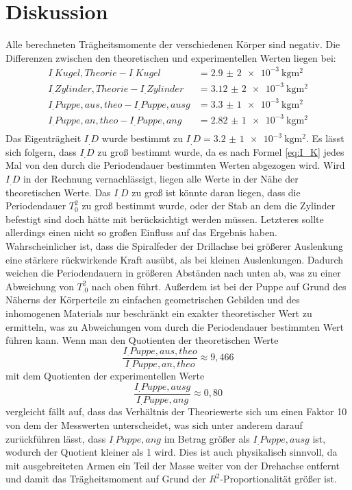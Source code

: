 \section{Diskussion}
\label{sec:Diskussion}
Alle berechneten Trägheitsmomente der verschiedenen Körper sind negativ.
Die Differenzen zwischen den theoretischen und experimentellen Werten liegen bei:
\begin{align*}
I_.{Kugel,Theorie}-I_.{Kugel}		&=\SI{2,9(2)e-3}{\kilo\gram\metre\squared}\\
I_.{Zylinder,Theorie}-I_.{Zylinder}	&=\SI{3,12(2)e-3}{\kilo\gram\metre\squared}\\
I_.{Puppe,aus,theo}-I_.{Puppe,ausg}	&=\SI{3,3(1)e-3}{\kilo\gram\metre\squared}\\
I_.{Puppe,an,theo}-I_.{Puppe,ang}	&=\SI{2,82(1)e-3}{\kilo\gram\metre\squared}\\
\end{align*}
Das Eigenträgheit $I_.D$ wurde bestimmt zu $I_.D=\SI{3,2(1)e-3}{\kilo\gram\metre\squared}$.
Es lässt sich folgern, dass $I_.D$ zu groß bestimmt wurde, da es nach Formel \eqref{eq:I_K} jedes Mal von den durch die Periodendauer bestimmten Werten abgezogen wird. Wird $I_.D$ in der Rechnung vernachlässigt, liegen alle Werte in der Nähe der theoretischen Werte.\newline
Das $I_.D$ zu groß ist könnte daran liegen, dass die Periodendauer $T_0^2$ zu groß bestimmt wurde, oder der Stab an dem die Zylinder befestigt sind doch hätte mit berücksichtigt werden müssen. Letzteres sollte allerdings einen nicht so großen Einfluss auf das Ergebnis haben. Wahrscheinlicher ist, dass die Spiralfeder der Drillachse bei größerer Auslenkung eine stärkere rückwirkende Kraft ausübt, als bei kleinen Auslenkungen. Dadurch weichen die Periodendauern in größeren Abständen nach unten ab, was zu einer Abweichung von $T_.0^2$ nach oben führt.\newline
Außerdem ist bei der Puppe auf Grund des Näherns der Körperteile zu einfachen geometrischen Gebilden und des inhomogenen Materials nur beschränkt ein exakter theoretischer Wert zu ermitteln, was zu Abweichungen vom durch die Periodendauer bestimmten Wert führen kann.
Wenn man den Quotienten der theoretischen Werte \[\frac{I_.{Puppe,aus,theo}}{I_.{Puppe,an,theo}}\approx 9,466\]
mit dem Quotienten der experimentellen Werte \[\frac{I_.{Puppe,ausg}}{I_.{Puppe,ang}}\approx 0,80\]
vergleicht fällt auf, dass das Verhältnis der Theoriewerte sich um einen Faktor 10 von dem der Messwerten unterscheidet, was sich unter anderem darauf zurückführen lässt, dass $I_.{Puppe,ang}$ im Betrag größer als $I_.{Puppe,ausg}$ ist, wodurch der Quotient kleiner als 1 wird. Dies ist auch physikalisch sinnvoll, da mit ausgebreiteten Armen ein Teil der Masse weiter von der Drehachse entfernt und damit das Trägheitsmoment auf Grund der $R^2$-Proportionalität größer ist.
